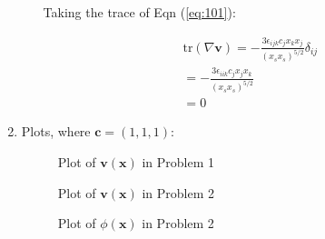 \begin{enumerate}
\begin{enumerate}
Taking the trace of Eqn (\ref{eq:101}):

\begin{align}
\text{tr}(\nabla \mathbf{v})=-\frac{3\epsilon_{ijk}c_{j}x_{k}x_{j}}{(x_{s}x_{s})^{5/2}}\delta_{ij} \\
=-\frac{3\epsilon_{iik}c_{j}x_{j}x_{k}}{(x_{s}x_{s})^{5/2}} \\
=0
\end{align}
        \end{enumerate}
        \pagebreak
        \item Plots, where $\mathbf{c} = (1, 1, 1)$:
\begin{figure}[htbp]
    \centering
    \caption{Plot of $\mathbf{v}(\mathbf{x})$ in Problem 1}
    \label{fig:plot1}
\end{figure}
\begin{figure}[htbp]
    \centering
    \caption{Plot of $\mathbf{v}(\mathbf{x})$ in Problem 2}
    \label{fig:phiplot}
\end{figure}
\begin{figure}[htbp]
    \centering
    \caption{Plot of $\phi(\mathbf{x})$ in Problem 2}
    \label{fig:vplot}
\end{figure}
         \end{enumerate}